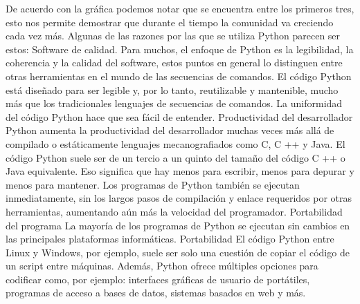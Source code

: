 De acuerdo con la gráfica podemos notar que se encuentra entre los primeros tres, esto nos
permite demostrar que durante el tiempo la comunidad va creciendo cada vez más.
Algunas de las razones por las que se utiliza Python parecen ser estos:
Software de calidad.
Para muchos, el enfoque de Python es la legibilidad, la coherencia y la calidad del software,
estos puntos en general lo distinguen entre otras herramientas en el mundo de las
secuencias de comandos. El código Python está diseñado para ser legible y, por lo tanto,
reutilizable y mantenible, mucho más que los tradicionales lenguajes de secuencias de
comandos. La uniformidad del código Python hace que sea fácil de entender.
Productividad del desarrollador
Python aumenta la productividad del desarrollador muchas veces más allá de compilado o
estáticamente lenguajes mecanografiados como C, C ++ y Java. El código Python suele ser
de un tercio a un quinto del tamaño del código C ++ o Java equivalente. Eso significa que
hay menos para escribir, menos para depurar y menos para mantener. Los programas de
Python también se ejecutan inmediatamente, sin los largos pasos de compilación y enlace
requeridos por otras herramientas, aumentando aún más la velocidad del programador.
Portabilidad del programa
La mayoría de los programas de Python se ejecutan sin cambios en las principales
plataformas informáticas. Portabilidad El código Python entre Linux y Windows, por
ejemplo, suele ser solo una cuestión de copiar el código de un script entre máquinas.
Además, Python ofrece múltiples opciones para codificar como, por ejemplo: interfaces
gráficas de usuario de portátiles, programas de acceso a bases de datos, sistemas basados en
web y más.

